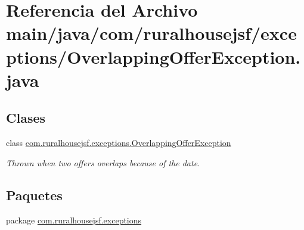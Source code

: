 \hypertarget{a00065}{}\section{Referencia del Archivo main/java/com/ruralhousejsf/exceptions/\+Overlapping\+Offer\+Exception.java}
\label{a00065}
\subsection*{Clases}
\begin{DoxyCompactItemize}
\item 
class \mbox{\hyperlink{a00212}{com.\+ruralhousejsf.\+exceptions.\+Overlapping\+Offer\+Exception}}
\begin{DoxyCompactList}\small\item\em Thrown when two offers overlaps because of the date. \end{DoxyCompactList}\end{DoxyCompactItemize}
\subsection*{Paquetes}
\begin{DoxyCompactItemize}
\item 
package \mbox{\hyperlink{a00118}{com.\+ruralhousejsf.\+exceptions}}
\end{DoxyCompactItemize}

